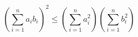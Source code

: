 \documentclass{article}
\begin{document}
\[
  \left( \sum_{i=1}^{n} a_i b_i \right)^{2}
  \le
  \left( \sum_{i=1}^{n} a_i^{2} \right)
  \left( \sum_{i=1}^{n} b_i^{2} \right)
\]
\end{document}
